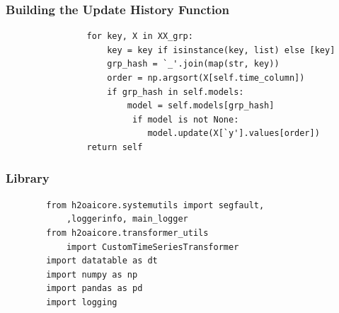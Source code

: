 \documentclass[11pt,
aspectratio=169,
hyperref={colorlinks}
]{beamer}
\begin{document}
\begin{frame}[fragile]
        \frametitle{Building the Update History Function}
        \begin{verbatim}
                for key, X in XX_grp:
                    key = key if isinstance(key, list) else [key]
                    grp_hash = `_'.join(map(str, key))
                    order = np.argsort(X[self.time_column])
                    if grp_hash in self.models:
                        model = self.models[grp_hash]
                         if model is not None:
                            model.update(X[`y'].values[order])
                return self
        \end{verbatim}
\end{frame}
\begin{frame}[fragile]
        \frametitle{Library}
        \begin{verbatim}
        from h2oaicore.systemutils import segfault, 
            ,loggerinfo, main_logger
        from h2oaicore.transformer_utils 
            import CustomTimeSeriesTransformer
        import datatable as dt
        import numpy as np
        import pandas as pd
        import logging
        \end{verbatim}
\end{frame}
\end{document}
